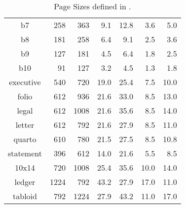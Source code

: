 \begin{table}[!ht]
\begin{center}
{\begin{tabular}{|c||r|r||r|r||r|r|}
  b7          &  258 &  363 &   9.1 &  12.8 &   3.6 &   5.0 \\
  b8          &  181 &  258 &   6.4 &   9.1 &   2.5 &   3.6 \\
  b9          &  127 &  181 &   4.5 &   6.4 &   1.8 &   2.5 \\
  b10         &   91 &  127 &   3.2 &   4.5 &   1.3 &   1.8 \\ \hline\hline
  executive   &  540 &  720 &  19.0 &  25.4 &   7.5 &  10.0 \\
  folio       &  612 &  936 &  21.6 &  33.0 &   8.5 &  13.0 \\
  legal       &  612 & 1008 &  21.6 &  35.6 &   8.5 &  14.0 \\
  letter      &  612 &  792 &  21.6 &  27.9 &   8.5 &  11.0 \\
  quarto      &  610 &  780 &  21.5 &  27.5 &   8.5 &  10.8 \\
  statement   &  396 &  612 &  14.0 &  21.6 &   5.5 &   8.5 \\ \hline\hline
  10x14       &  720 & 1008 &  25.4 &  35.6 &  10.0 &  14.0 \\
  ledger      & 1224 &  792 &  43.2 &  27.9 &  17.0 &  11.0 \\
  tabloid     &  792 & 1224 &  27.9 &  43.2 &  11.0 &  17.0 \\ \hline
 \end{tabular}
} %
\caption{\label{tbl:PageSztbl}Page Sizes defined in {\prog}.}\hspace{1cm}
\end{center}
\end{table}
\vfill
